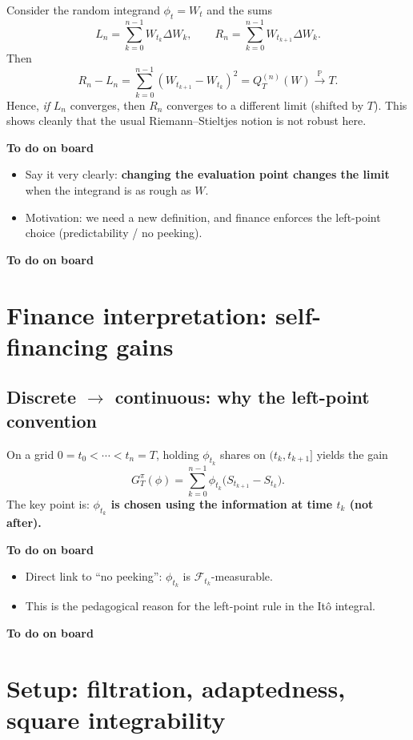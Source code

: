 \documentclass[11pt]{article}
\newcommand{\Pbb}{\mathbb{P}}
\newcommand{\F}{\mathcal{F}}
\newcommand{\1}{\mathbf{1}}
\numberwithin{equation}{section}
\theoremstyle{plain}
\theoremstyle{definition}
\theoremstyle{remark}
\begin{document}
Consider the random integrand $\phi_t=W_t$ and the sums
\[
L_n=\sum_{k=0}^{n-1}W_{t_k}\Delta W_k,
\qquad
R_n=\sum_{k=0}^{n-1}W_{t_{k+1}}\Delta W_k.
\]
Then
\[
R_n-L_n=\sum_{k=0}^{n-1}(W_{t_{k+1}}-W_{t_k})^2
=Q_T^{(n)}(W)\xrightarrow[]{\Pbb}T.
\]
Hence, \emph{if} $L_n$ converges, then $R_n$ converges to a different limit (shifted by $T$).
This shows cleanly that the usual Riemann--Stieltjes notion is not robust here.

\textbf{To do on board}
\begin{itemize}
  \item Say it very clearly: \textbf{changing the evaluation point changes the limit}
  when the integrand is as rough as $W$.
  \item Motivation: we need a new definition, and finance enforces the left-point choice
  (predictability / no peeking).
\end{itemize}
\textbf{To do on board}

\section{Finance interpretation: self-financing gains}

\subsection{Discrete $\to$ continuous: why the left-point convention}

On a grid $0=t_0<\cdots<t_n=T$, holding $\phi_{t_k}$ shares on $(t_k,t_{k+1}]$ yields the gain
\[
G_T^\pi(\phi)=\sum_{k=0}^{n-1}\phi_{t_k}\big(S_{t_{k+1}}-S_{t_k}\big).
\]
The key point is: \textbf{$\phi_{t_k}$ is chosen using the information at time $t_k$ (not after).}

\textbf{To do on board}
\begin{itemize}
  \item Direct link to ``no peeking'': $\phi_{t_k}$ is $\F_{t_k}$-measurable.
  \item This is the pedagogical reason for the left-point rule in the It\^o integral.
\end{itemize}
\textbf{To do on board}

\section{Setup: filtration, adaptedness, square integrability}
\end{document}
